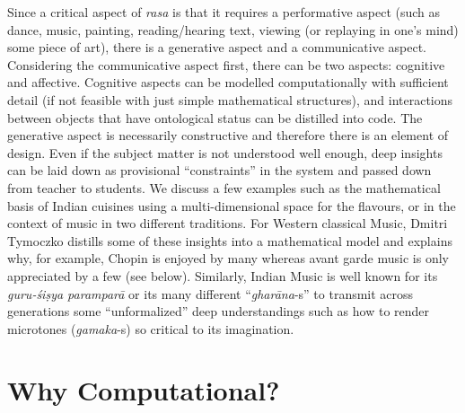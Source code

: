 Since a critical aspect of \textsl{rasa} is that it requires a performative aspect (such as dance, music, painting, reading/hearing text, viewing (or replaying in one’s mind) some piece of art), there is a generative aspect and a communicative aspect. Considering the communicative aspect first, there can be two aspects: cognitive and affective. Cognitive aspects can be modelled computationally with sufficient detail (if not feasible with just simple mathematical structures), and interactions between objects that have ontological status can be distilled into code. The generative aspect is necessarily constructive and therefore there is an element of design. Even if the subject matter is not understood well enough, deep insights can be laid down as provisional “constraints” in the system and passed down from teacher to students. We discuss a few examples such as the mathematical basis of Indian cuisines using a multi-dimensional space for the flavours, or in the context of music in two different traditions. For Western classical Music, Dmitri Tymoczko distills some of these insights into a mathematical model and explains why, for example, Chopin is enjoyed by many whereas avant garde music is only appreciated by a few (see below). Similarly, Indian Music is well known for its \textsl{guru-śiṣya paramparā} or its many different “\textsl{gharāna}-s” to transmit across generations some “unformalized” deep understandings such as how to render microtones (\textsl{gamaka}-s) so critical to its imagination.\\[-20pt] 

\section*{Why Computational?}

